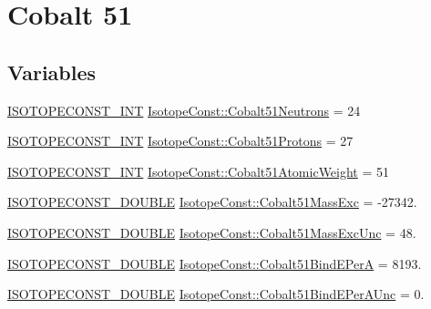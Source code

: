 \hypertarget{group___isotope_const-_cobalt-_co51}{}\section{Cobalt 51}
\label{group___isotope_const-_cobalt-_co51}
\subsection*{Variables}
\begin{DoxyCompactItemize}
\item 
\mbox{\hyperlink{group___isotope_const-_macros_ga5f18360b3e99483a35c32d789e62621c}{I\+S\+O\+T\+O\+P\+E\+C\+O\+N\+S\+T\+\_\+\+I\+NT}} \mbox{\hyperlink{group___isotope_const-_cobalt-_co51_gab2d92ea0df3807d44b3402f0fc73117f}{Isotope\+Const\+::\+Cobalt51\+Neutrons}} = 24
\item 
\mbox{\hyperlink{group___isotope_const-_macros_ga5f18360b3e99483a35c32d789e62621c}{I\+S\+O\+T\+O\+P\+E\+C\+O\+N\+S\+T\+\_\+\+I\+NT}} \mbox{\hyperlink{group___isotope_const-_cobalt-_co51_ga05d19077598f5b33bf7f4429f1da0921}{Isotope\+Const\+::\+Cobalt51\+Protons}} = 27
\item 
\mbox{\hyperlink{group___isotope_const-_macros_ga5f18360b3e99483a35c32d789e62621c}{I\+S\+O\+T\+O\+P\+E\+C\+O\+N\+S\+T\+\_\+\+I\+NT}} \mbox{\hyperlink{group___isotope_const-_cobalt-_co51_ga7adb200f1a6c0879c343b396afc9298b}{Isotope\+Const\+::\+Cobalt51\+Atomic\+Weight}} = 51
\item 
\mbox{\hyperlink{group___isotope_const-_macros_ga8f45a7272ce02c0b4c65c44636ed719a}{I\+S\+O\+T\+O\+P\+E\+C\+O\+N\+S\+T\+\_\+\+D\+O\+U\+B\+LE}} \mbox{\hyperlink{group___isotope_const-_cobalt-_co51_ga4611c66144abb1f8ac4f4429cf8bd1b1}{Isotope\+Const\+::\+Cobalt51\+Mass\+Exc}} = -\/27342.
\item 
\mbox{\hyperlink{group___isotope_const-_macros_ga8f45a7272ce02c0b4c65c44636ed719a}{I\+S\+O\+T\+O\+P\+E\+C\+O\+N\+S\+T\+\_\+\+D\+O\+U\+B\+LE}} \mbox{\hyperlink{group___isotope_const-_cobalt-_co51_gaa3b098bb70f3f9c3f351fac99951effa}{Isotope\+Const\+::\+Cobalt51\+Mass\+Exc\+Unc}} = 48.
\item 
\mbox{\hyperlink{group___isotope_const-_macros_ga8f45a7272ce02c0b4c65c44636ed719a}{I\+S\+O\+T\+O\+P\+E\+C\+O\+N\+S\+T\+\_\+\+D\+O\+U\+B\+LE}} \mbox{\hyperlink{group___isotope_const-_cobalt-_co51_ga509481e613dddfd3870ee50b931a49bd}{Isotope\+Const\+::\+Cobalt51\+Bind\+E\+PerA}} = 8193.
\item 
\mbox{\hyperlink{group___isotope_const-_macros_ga8f45a7272ce02c0b4c65c44636ed719a}{I\+S\+O\+T\+O\+P\+E\+C\+O\+N\+S\+T\+\_\+\+D\+O\+U\+B\+LE}} \mbox{\hyperlink{group___isotope_const-_cobalt-_co51_gaa95460a8734d42f07791f9c78b619440}{Isotope\+Const\+::\+Cobalt51\+Bind\+E\+Per\+A\+Unc}} = 0.

\end{DoxyCompactItemize}
